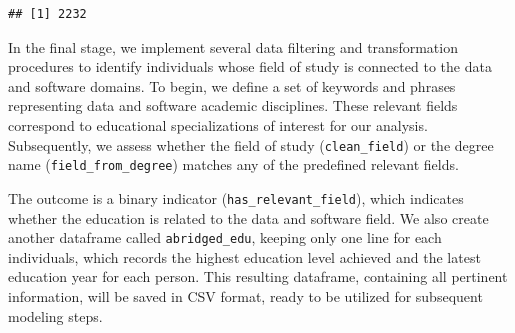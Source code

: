 \documentclass[11pt,]{article}
\newenvironment{Shaded}{\begin{snugshade}}{\end{snugshade}}
\newcommand{\AttributeTok}[1]{\textcolor[rgb]{0.13,0.29,0.53}{#1}}
\newcommand{\CommentTok}[1]{\textcolor[rgb]{0.56,0.35,0.01}{\textit{#1}}}
\newcommand{\ConstantTok}[1]{\textcolor[rgb]{0.56,0.35,0.01}{#1}}
\newcommand{\FunctionTok}[1]{\textcolor[rgb]{0.13,0.29,0.53}{\textbf{#1}}}
\newcommand{\NormalTok}[1]{#1}
\newcommand{\OtherTok}[1]{\textcolor[rgb]{0.56,0.35,0.01}{#1}}
\newcommand{\SpecialCharTok}[1]{\textcolor[rgb]{0.81,0.36,0.00}{\textbf{#1}}}
\newcommand{\StringTok}[1]{\textcolor[rgb]{0.31,0.60,0.02}{#1}}
\begin{document}
\begin{Shaded}
\end{Shaded}

\begin{verbatim}
## [1] 2232
\end{verbatim}

In the final stage, we implement several data filtering and
transformation procedures to identify individuals whose field of study
is connected to the data and software domains. To begin, we define a set
of keywords and phrases representing data and software academic
disciplines. These relevant fields correspond to educational
specializations of interest for our analysis. Subsequently, we assess
whether the field of study (\texttt{clean\_field}) or the degree name
(\texttt{field\_from\_degree}) matches any of the predefined relevant
fields.

The outcome is a binary indicator (\texttt{has\_relevant\_field}), which
indicates whether the education is related to the data and software
field. We also create another dataframe called \texttt{abridged\_edu},
keeping only one line for each individuals, which records the highest
education level achieved and the latest education year for each person.
This resulting dataframe, containing all pertinent information, will be
saved in CSV format, ready to be utilized for subsequent modeling steps.
\end{document}
